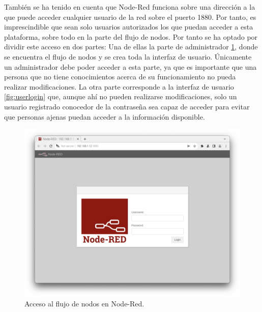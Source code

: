 También se ha tenido en cuenta que Node-Red funciona sobre una dirección a la que puede acceder cualquier usuario de la red sobre el puerto 1880. Por tanto, es imprescindible que sean solo usuarios autorizados los que puedan acceder a esta plataforma, sobre todo en la parte del flujo de nodos. Por tanto se ha optado por dividir este acceso en dos partes: Una de ellas la parte de administrador \ref{fig:adminlogin}, donde se encuentra el flujo de nodos y se crea toda la interfaz de usuario. Únicamente un administrador debe poder acceder a esta parte, ya que es importante que una persona que no tiene conocimientos acerca de su funcionamiento no pueda realizar modificaciones. La otra parte corresponde a la interfaz de usuario \ref{fig:userlogin} que, aunque ahí no pueden realizarse modificaciones, solo un usuario registrado conocedor de la contraseña sea capaz de acceder para evitar que personas ajenas puedan acceder a la información disponible.\\
\begin{figure} [h!]
  \begin{center}
    \includegraphics[width=12cm]{figs/adminlogin}
  \end{center}
  \caption{Acceso al flujo de nodos en Node-Red.}
  \label{fig:adminlogin}
\end{figure}

